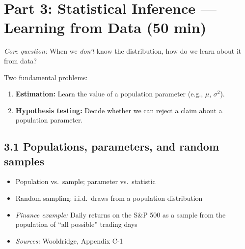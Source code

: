 \documentclass[letterpaper,10pt]{article}
\begin{document}
\section*{Part 3: Statistical Inference --- Learning from Data \hfill \normalsize\textnormal{(50 min)}}

\noindent\textit{Core question:} When we \emph{don't} know the distribution, how do we learn about it from data?

\medskip
\noindent Two fundamental problems:
\begin{enumerate}
    \item \textbf{Estimation:} Learn the value of a population parameter (e.g., $\mu$, $\sigma^2$).
    \item \textbf{Hypothesis testing:} Decide whether we can reject a claim about a population parameter.
\end{enumerate}

\subsection*{3.1 Populations, parameters, and random samples}
\begin{itemize}
    \item Population vs.\ sample; parameter vs.\ statistic
    \item Random sampling: i.i.d.\ draws from a population distribution
    \item \textit{Finance example:} Daily returns on the S\&P 500 as a sample from the population of ``all possible'' trading days
    \item \textit{Sources:} Wooldridge, Appendix C-1
\end{itemize}
\end{document}
